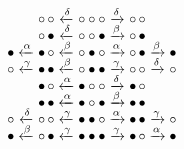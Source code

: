 \documentclass[11pt]{article}
\begin{document}
\TeXtoEPS
\(
\begin{array}{@{}r@{\;}c@{\;}r@{\;}c@{\;}c@{\;}c@{\;}l@{\;}c@{\;}l@{}}
&& \circ \, \circ
& \xleftarrow{\smash{\delta}}
& \circ \circ \circ
& \xrightarrow{\smash{\delta}}
& \circ \, \circ\\
&& \circ \, \bullet
& \xleftarrow{\smash{\delta}}
& \circ \circ \bullet
& \xrightarrow{\smash{\beta}}
& \circ \, \bullet\\
  \bullet
& \xleftarrow{\smash{\alpha}} 
& \bullet \, \circ
& \xleftarrow{\smash{\beta}}
& \circ \bullet \circ
& \xrightarrow{\smash{\alpha}}
& \circ \, \bullet
& \xrightarrow{\smash{\beta}}
& \bullet\\
  \circ
& \xleftarrow{\smash{\gamma}}
& \bullet \, \bullet
& \xleftarrow{\smash{\beta}}
& \circ \bullet \bullet
& \xrightarrow{\smash{\gamma}}
& \circ \, \circ
& \xrightarrow{\smash{\delta}}
& \circ\\
&& \bullet \, \circ
& \xleftarrow{\smash{\alpha}}
& \bullet \circ \circ
& \xrightarrow{\smash{\delta}}
& \bullet \, \circ\\
&& \bullet \, \bullet
& \xleftarrow{\smash{\alpha}} 
& \bullet \circ \bullet
& \xrightarrow{\smash{\beta}} 
& \bullet \, \bullet\\
  \circ
& \xleftarrow{\smash{\delta}} 
& \circ \, \circ
& \xleftarrow{\smash{\gamma}}
& \bullet \bullet \circ
& \xrightarrow{\smash{\alpha}}
& \bullet \, \bullet
& \xrightarrow{\smash{\gamma}}
& \circ\\
  \bullet
& \xleftarrow{\smash{\beta}}
& \circ \, \bullet
& \xleftarrow{\smash{\gamma}}
& \bullet \bullet \bullet
& \xrightarrow{\smash{\gamma}}
& \bullet \, \circ
& \xrightarrow{\smash{\alpha}}
& \bullet
\end{array}
\)
\endTeXtoEPS
\end{document}
